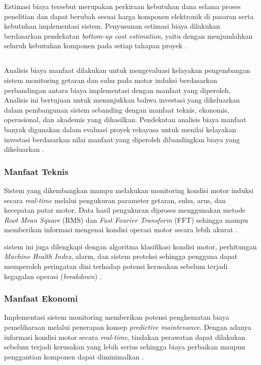 \documentclass{elsinta}
\begin{document}
Estimasi biaya tersebut merupakan perkiraan kebutuhan dana selama proses penelitian dan dapat berubah sesuai harga komponen elektronik di pasaran serta kebutuhan implementasi sistem. Penyusunan estimasi biaya dilakukan berdasarkan pendekatan \textit{bottom-up cost estimation}, yaitu dengan menjumlahkan seluruh kebutuhan komponen pada setiap tahapan proyek \cite{ProjectManagementInstitute2021}.

\subsection{\CostBenefitTitle}
Analisis biaya manfaat dilakukan untuk mengevaluasi kelayakan pengembangan sistem monitoring getaran dan suhu pada motor induksi berdasarkan perbandingan antara biaya implementasi dengan manfaat yang diperoleh. Analisis ini bertujuan untuk menunjukkan bahwa investasi yang dikeluarkan dalam pembangunan sistem sebanding dengan manfaat teknis, ekonomis, operasional, dan akademis yang dihasilkan. Pendekatan analisis biaya manfaat banyak digunakan dalam evaluasi proyek rekayasa untuk menilai kelayakan investasi berdasarkan nilai manfaat yang diperoleh dibandingkan biaya yang dikeluarkan \cite{boardman2018}.

\subsubsection{Manfaat Teknis}

Sistem yang dikembangkan mampu melakukan monitoring kondisi motor induksi secara \textit{real-time} melalui pengukuran parameter getaran, suhu, arus, dan kecepatan putar motor. Data hasil pengukuran diproses menggunakan metode \textit{Root Mean Square} (RMS) dan \textit{Fast Fourier Transform} (FFT) sehingga mampu memberikan informasi mengenai kondisi operasi motor secara lebih akurat \cite{Filho2025,Oppenheim2021}.

sistem ini juga dilengkapi dengan algoritma klasifikasi kondisi motor, perhitungan \textit{Machine Health Index}, alarm, dan sistem proteksi sehingga pengguna dapat memperoleh peringatan dini terhadap potensi kerusakan sebelum terjadi kegagalan operasi (\textit{breakdown}) \cite{Jardine2006}.
\subsubsection{Manfaat Ekonomi}

Implementasi sistem monitoring memberikan potensi penghematan biaya pemeliharaan melalui penerapan konsep \textit{predictive maintenance}. Dengan adanya informasi kondisi motor secara \textit{real-time}, tindakan perawatan dapat dilakukan sebelum terjadi kerusakan yang lebih serius sehingga biaya perbaikan maupun penggantian komponen dapat diminimalkan \cite{Jardine2006}.
\end{document}

